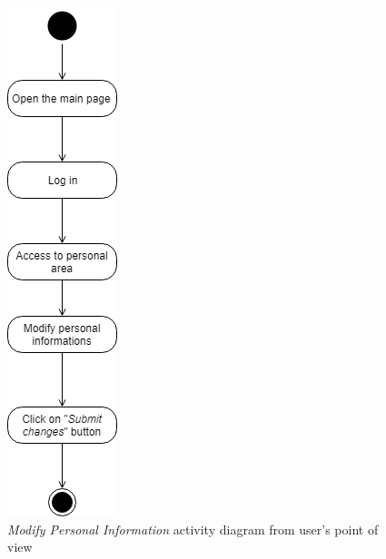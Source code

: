 \begin{figure}[H]
\begin{center}
  \includegraphics[height=0.6\paperheight]{img/activity/ModifyPersonalInformations.png}
  \hspace{0.05\linewidth}
  \centering
  \caption{\textit{Modify Personal Information} activity diagram from user's point of view}
  \label{img:modifyPersonalInformationsActivityDiagram}
\end{center}
\end{figure}

